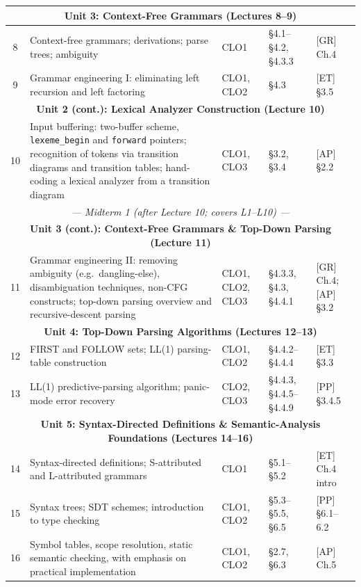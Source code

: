 \documentclass{article}
\begin{document}
\begin{longtable}{|c|p{5.1cm}|p{1.1cm}|p{2.5cm}|p{3.3cm}|}
\multicolumn{5}{|c|}{\cellcolor{gray!20}\textbf{Unit 3: Context-Free Grammars (Lectures 8--9)}} \\ \hline
8 & Context-free grammars; derivations; parse trees; ambiguity & CLO1 & \S4.1--\S4.2, \S4.3.3 & [GR] Ch.4 \\ \hline
9 & Grammar engineering I: eliminating left recursion and left factoring & CLO1, CLO2 & \S4.3 & [ET] \S3.5 \\ \hline

\multicolumn{5}{|c|}{\cellcolor{gray!20}\textbf{Unit 2 (cont.): Lexical Analyzer Construction (Lecture 10)}} \\ \hline
10 & Input buffering: two-buffer scheme, \texttt{lexeme\_begin} and \texttt{forward} pointers; recognition of tokens via transition diagrams and transition tables; hand-coding a lexical analyzer from a transition diagram & CLO1, CLO3 & \S3.2, \S3.4 & [AP] \S2.2 \\ \hline

\multicolumn{5}{|c|}{\cellcolor{yellow!25}\textit{--- Midterm 1 (after Lecture 10; covers L1--L10) ---}} \\ \hline

\multicolumn{5}{|c|}{\cellcolor{gray!20}\textbf{Unit 3 (cont.): Context-Free Grammars \& Top-Down Parsing (Lecture 11)}} \\ \hline
11 & Grammar engineering II: removing ambiguity (e.g.\ dangling-else), disambiguation techniques, non-CFG constructs; top-down parsing overview and recursive-descent parsing & CLO1, CLO2, CLO3 & \S4.3.3, \S4.3, \S4.4.1 & [GR] Ch.4; [AP] \S3.2 \\ \hline

\multicolumn{5}{|c|}{\cellcolor{gray!20}\textbf{Unit 4: Top-Down Parsing Algorithms (Lectures 12--13)}} \\ \hline
12 & FIRST and FOLLOW sets; LL(1) parsing-table construction & CLO1, CLO2 & \S4.4.2--\S4.4.4 & [ET] \S3.3 \\ \hline
13 & LL(1) predictive-parsing algorithm; panic-mode error recovery & CLO2, CLO3 & \S4.4.3, \S4.4.5--\S4.4.9 & [PP] \S3.4.5 \\ \hline

\multicolumn{5}{|c|}{\cellcolor{gray!20}\textbf{Unit 5: Syntax-Directed Definitions \& Semantic-Analysis Foundations (Lectures 14--16)}} \\ \hline
14 & Syntax-directed definitions; S-attributed and L-attributed grammars & CLO1 & \S5.1--\S5.2 & [ET] Ch.4 intro \\ \hline
15 & Syntax trees; SDT schemes; introduction to type checking & CLO1, CLO2 & \S5.3--\S5.5, \S6.5 & [PP] \S6.1--6.2 \\ \hline
16 & Symbol tables, scope resolution, static semantic checking, with emphasis on practical implementation & CLO1, CLO2 & \S2.7, \S6.3 & [AP] Ch.5 \\ \hline


\end{longtable}
\end{document}
